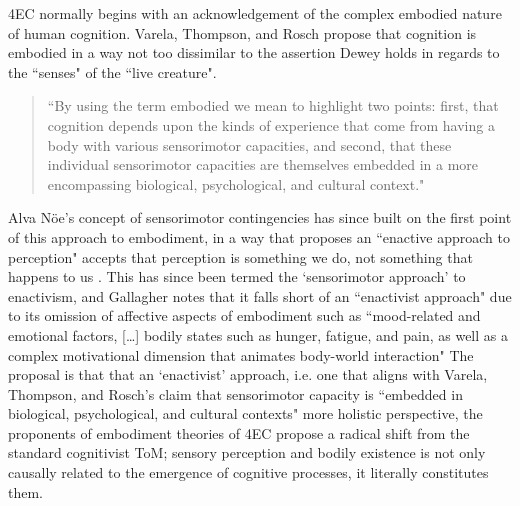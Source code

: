 4EC normally begins with an acknowledgement of the complex embodied nature of human cognition. Varela, Thompson, and Rosch propose that cognition is embodied in a way not too dissimilar to the assertion Dewey holds in regards to the ``senses" of the ``live creature".
\begin{quote}
    ``By using the term embodied we mean to highlight two points: first, that cognition depends upon the kinds of experience that come from having a body with various sensorimotor capacities, and second, that these individual sensorimotor capacities are themselves embedded in a more encompassing biological, psychological, and cultural context." \citeyearpar[pp. 172-173]{varela1993}
\end{quote}
Alva Nöe's concept of sensorimotor contingencies has since built on the first point of this approach to embodiment, in a way that proposes an ``enactive approach to perception" accepts that perception is something we do, not something that happens to us \citep{noe2004}. This has since been termed the `sensorimotor approach' to enactivism, and Gallagher notes that it falls short of an ``enactivist approach" due to its omission of affective aspects of embodiment such as ``mood-related and emotional factors, […] bodily states such as hunger, fatigue, and pain, as well as a complex motivational dimension that animates body-world interaction"  \citep[p. 150]{gallagher2017} The proposal is that that an `enactivist' approach, i.e. one that aligns with Varela, Thompson, and Rosch's claim that sensorimotor capacity is ``embedded in biological, psychological, and cultural contexts" more holistic perspective, the proponents of embodiment theories of 4EC propose a radical shift from the standard cognitivist ToM; sensory perception and bodily existence is not only causally related to the emergence of cognitive processes, it literally constitutes them. 

